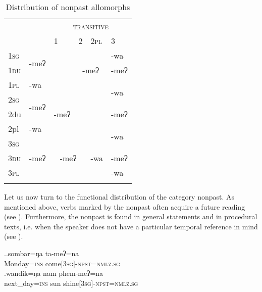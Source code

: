 
\begin{table}
\begin{centering} 
\begin{tabular}{llp{1.4cm}p{1.4cm}lp{1.4cm}}
\lsptoprule
		& {\multirow{2}{*}{\scshape intransitive}}&	\multicolumn{4}{c}{ {\scshape transitive}}  \\
		&&	 {\scshape 1}&  {\scshape 2}&  {\scshape 2pl} &  {\scshape 3} \\
\midrule
 {\scshape 1sg} 		&\multirow{2}{*}{-meʔ}& \cellcolor[gray]{.8}&\multicolumn{2}{c}{}&-wa\\
 \cline{1-1} \cline{6-6} 		
 {\scshape 1du}		& & \cellcolor[gray]{.8}&\multicolumn{2}{c}{-meʔ}&-meʔ\\
 \cline{1-2} \cline{6-6} 			
 {\scshape 1pl}		&-wa & \cellcolor[gray]{.8}&\multicolumn{2}{c}{}&\multirow{2}{*}{-wa}\\
 \cline{1-5}				
 {\scshape 2sg} 		&\multirow{2}{*}{-meʔ}&&\multicolumn{2}{c}{\cellcolor[gray]{.8}} &\\
 \cline{1-1} \cline{6-6}			
 {\sc2du}		& &-meʔ& \multicolumn{2}{c}{\cellcolor[gray]{.8}}  &-meʔ\\
 \cline{1-2} \cline{6-6}			
 {\sc2pl}		&-wa &&\multicolumn{2}{c}{\cellcolor[gray]{.8}}  &\multirow{2}{*}{-wa}\\
 \cline{1-5}				
 {\scshape 3sg} 		&&\multicolumn{2}{c}{} &  &\\
  \cline{1-1}  \cline{6-6}					
 {\scshape 3du}&-meʔ&\multicolumn{2}{c}{-meʔ}  &  -wa&-meʔ\\
 \cline{1-1} \cline{6-6}
 {\scshape 3pl}& &\multicolumn{2}{c}{}&  &-wa\\
\lspbottomrule
\end{tabular}
\caption{Distribution of nonpast allomorphs}\label{par-npst-allo}
\end{centering}
\end{table}

Let us now turn to the functional distribution of the category nonpast. As mentioned above, verbs marked by the nonpast  often acquire a future reading (see \Next).  Furthermore, the nonpast is  found in general statements and in procedural texts, i.e. when the speaker does not have a particular temporal reference in mind (see \NNext). 

\ex.\ag.sombar=ŋa ta-meʔ=na\\
Monday{\scshape =ins} come{\scshape [3sg]-npst=nmlz.sg}\\
\bg.wandik=ŋa nam phem-meʔ=na\\
next\_day{\scshape =ins} sun shine{\scshape [3sg]-npst=nmlz.sg}\\


